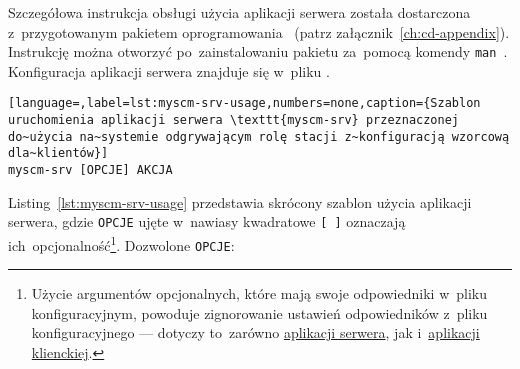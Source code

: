 \documentclass[thesis]{subfiles}
\begin{document}
Szczegółowa instrukcja obsługi użycia aplikacji serwera została dostarczona z~przygotowanym pakietem oprogramowania \texttt{\srvappname{}}~(patrz załącznik~\ref{ch:cd-appendix}). Instrukcję można otworzyć po~zainstalowaniu pakietu \texttt{\srvappname{}} za~pomocą komendy \texttt{man~\srvappname{}}. Konfiguracja aplikacji serwera znajduje się w~pliku \myscmsrvconfig{}.

\begin{lstlisting}[language=,label=lst:myscm-srv-usage,numbers=none,caption={Szablon uruchomienia aplikacji serwera \texttt{myscm-srv} przeznaczonej do~użycia na~systemie odgrywającym rolę stacji z~konfiguracją wzorcową dla~klientów}]
myscm-srv [OPCJE] AKCJA
\end{lstlisting}

Listing~\ref{lst:myscm-srv-usage} przedstawia skrócony szablon użycia aplikacji serwera, gdzie \texttt{OPCJE} ujęte w~nawiasy kwadratowe \texttt{[~]} oznaczają ich~opcjonalność\footnote{Użycie argumentów opcjonalnych, które mają swoje odpowiedniki w~pliku konfiguracyjnym, powoduje zignorowanie ustawień odpowiedników z~pliku konfiguracyjnego --- dotyczy to~zarówno \hyperref[sec:srv-app]{aplikacji serwera}, jak i~\hyperref[sec:cli-app]{aplikacji klienckiej}.}. Dozwolone \texttt{OPCJE}:\mynobreakpar
\end{document}
